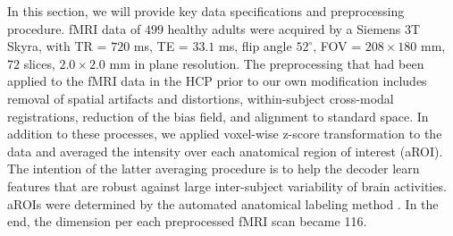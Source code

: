In this section, we will provide key data specifications and preprocessing procedure.
%
fMRI data of $499$ healthy adults were acquired by a Siemens 3T Skyra, with TR = $720$ ms, TE = $33.1$ ms, flip angle $52^\circ$, FOV = $208 \times 180$ mm, $72$ slices, $2.0 \times 2.0$ mm in plane resolution.
The preprocessing that had been applied to the fMRI data in the HCP prior to our own modification includes removal of spatial artifacts and distortions, within-subject cross-modal registrations, reduction of the bias field, and alignment to standard space.
In addition to these processes, we applied voxel-wise z-score transformation to the data and averaged the intensity over each anatomical region of interest (aROI).
%
The intention of the latter averaging procedure is to help the decoder learn features that are robust against
large inter-subject variability of brain activities.
%
aROIs were determined by the automated anatomical labeling method \cite{tzourio2002automated}.
%
In the end, the dimension per each preprocessed fMRI scan became 116.

